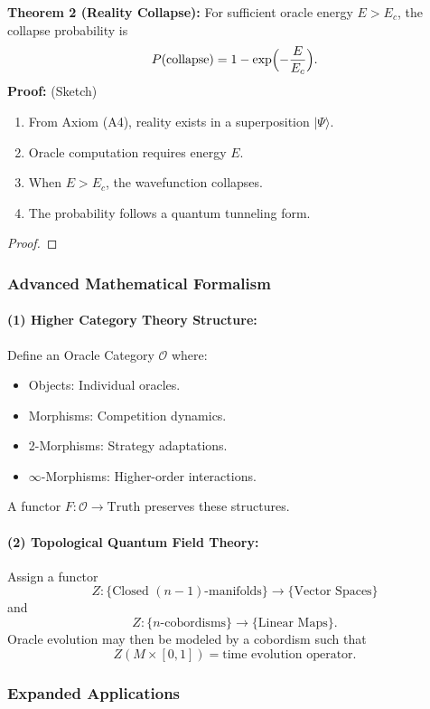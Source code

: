 \documentclass[11pt]{article}
\begin{document}
\bigskip

\textbf{Theorem 2 (Reality Collapse):} For sufficient oracle energy $E>E_c$, the collapse probability is
\[
P(\text{collapse})=1-\exp\Bigl(-\frac{E}{E_c}\Bigr).
\]
\noindent\textbf{Proof:} (Sketch)
\begin{enumerate}[label=(\roman*)]
    \item From Axiom (A4), reality exists in a superposition $|\Psi\rangle$.
    \item Oracle computation requires energy $E$.
    \item When $E>E_c$, the wavefunction collapses.
    \item The probability follows a quantum tunneling form.
\end{enumerate}
\begin{proof}
\end{proof}

\subsubsection{Advanced Mathematical Formalism}

\paragraph{(1) Higher Category Theory Structure:} 
Define an Oracle Category $\mathcal{O}$ where:
\begin{itemize}
    \item Objects: Individual oracles.
    \item Morphisms: Competition dynamics.
    \item 2-Morphisms: Strategy adaptations.
    \item $\infty$-Morphisms: Higher-order interactions.
\end{itemize}
A functor $F:\mathcal{O}\to\text{Truth}$ preserves these structures.

\paragraph{(2) Topological Quantum Field Theory:} 
Assign a functor
\[
 Z:\{\text{Closed }(n-1)\text{-manifolds}\}\to \{\text{Vector Spaces}\}
\]
and 
\[
Z:\{n\text{-cobordisms}\}\to \{\text{Linear Maps}\}.
\]
Oracle evolution may then be modeled by a cobordism such that
\[
Z(M\times[0,1])=\text{time evolution operator}.
\]

\subsubsection{Expanded Applications}
\end{document}
